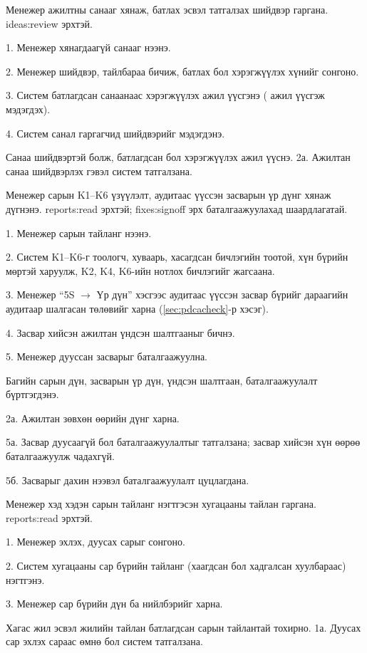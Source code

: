 {Менежер ажилтны санааг хянаж, батлах эсвэл татгалзах шийдвэр гаргана.}
{ideas:review эрхтэй.}
{1. Менежер хянагдаагүй санааг нээнэ.\par
 2. Менежер шийдвэр, тайлбараа бичиж, батлах бол хэрэгжүүлэх хүнийг сонгоно.\par
 3. Систем батлагдсан санаанаас хэрэгжүүлэх ажил үүсгэнэ ( ажил үүсгэж мэдэгдэх).\par
 4. Систем санал гаргагчид шийдвэрийг мэдэгдэнэ.}
{Санаа шийдвэртэй болж, батлагдсан бол хэрэгжүүлэх ажил үүснэ.}
{2а. Ажилтан санаа шийдвэрлэх гэвэл систем татгалзана.}

{Менежер сарын K1--K6 үзүүлэлт, аудитаас үүссэн засварын үр дүнг хянаж дүгнэнэ.}
{reports:read эрхтэй; fixes:signoff эрх баталгаажуулахад шаардлагатай.}
{1. Менежер сарын тайланг нээнэ.\par
 2. Систем K1--K6-г тоологч, хуваарь, хасагдсан бичлэгийн тоотой, хүн бүрийн мөртэй харуулж, K2, K4, K6-ийн нотлох бичлэгийг жагсаана.\par
 3. Менежер ``5S $\rightarrow$ Үр дүн'' хэсгээс аудитаас үүссэн засвар бүрийг дараагийн аудитаар шалгасан төлөвийг харна (\ref{sec:pdcacheck}-р хэсэг).\par
 4. Засвар хийсэн ажилтан үндсэн шалтгааныг бичнэ.\par
 5. Менежер дууссан засварыг баталгаажуулна.}
{Багийн сарын дүн, засварын үр дүн, үндсэн шалтгаан, баталгаажуулалт бүртгэгдэнэ.}
{2а. Ажилтан зөвхөн өөрийн дүнг харна.\par
 5а. Засвар дуусаагүй бол баталгаажуулалтыг татгалзана; засвар хийсэн хүн өөрөө баталгаажуулж чадахгүй.\par
 5б. Засварыг дахин нээвэл баталгаажуулалт цуцлагдана.}

{Менежер хэд хэдэн сарын тайланг нэгтгэсэн хугацааны тайлан гаргана.}
{reports:read эрхтэй.}
{1. Менежер эхлэх, дуусах сарыг сонгоно.\par
 2. Систем хугацааны сар бүрийн тайланг (хаагдсан бол хадгалсан хуулбараас) нэгтгэнэ.\par
 3. Менежер сар бүрийн дүн ба нийлбэрийг харна.}
{Хагас жил эсвэл жилийн тайлан батлагдсан сарын тайлантай тохирно.}
{1а. Дуусах сар эхлэх сараас өмнө бол систем татгалзана.}

